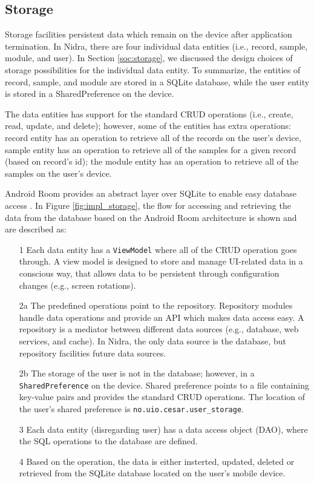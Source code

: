 \subsection{Storage}\label{ioc:storage}

Storage facilities persistent data which remain on the device after application termination. In Nidra, there are four individual data entities (i.e., record, sample, module, and user). In Section \ref{soc:storage}, we discussed the design choices of storage possibilities for the individual data entity. To summarize, the entities of record, sample, and module are stored in a SQLite database, while the user entity is stored in a SharedPreference on the device.

The data entities has support for the standard CRUD operations (i.e., create, read, update, and delete); however, some of the entities has extra operations: record entity has an operation to retrieve all of the records on the user's device, sample entity has an operation to retrieve all of the samples for a given record (based on record's id); the module entity has an operation to retrieve all of the samples on the user's device.

Android Room provides an abstract layer over SQLite to enable easy database access \cite{room}. In Figure \ref{fig:impl_storage}, the flow for accessing and retrieving the data from the database based on the Android Room architecture is shown and are described as:

\begin{itemize}
    \item[1] Each data entity has a \verb|ViewModel| where all of the CRUD operation goes through.  A view model is designed to store and manage UI-related data in a conscious way, that allows data to be persistent through configuration changes (e.g., screen rotations). 
     \item[2a] The predefined operations point to the repository. Repository modules handle data operations and provide an API  which makes data access easy. A repository is a mediator between different data sources (e.g., database, web services, and cache). In Nidra, the only data source is the database, but repository facilities future data sources. 
    \item[2b] The storage of the user is not in the database; however, in a \verb|SharedPreference| on the device. Shared preference points to a file containing key-value pairs and provides the standard CRUD operations. The location of the user's shared preference is \verb|no.uio.cesar.user_storage|. 
    \item[3] Each data entity (disregarding user) has a data access object (DAO), where the SQL operations to the database are defined. 
    \item[4] Based on the operation, the data is either insterted, updated, deleted or retrieved from the SQLite database located on the user's mobile device. 
\end{itemize}

